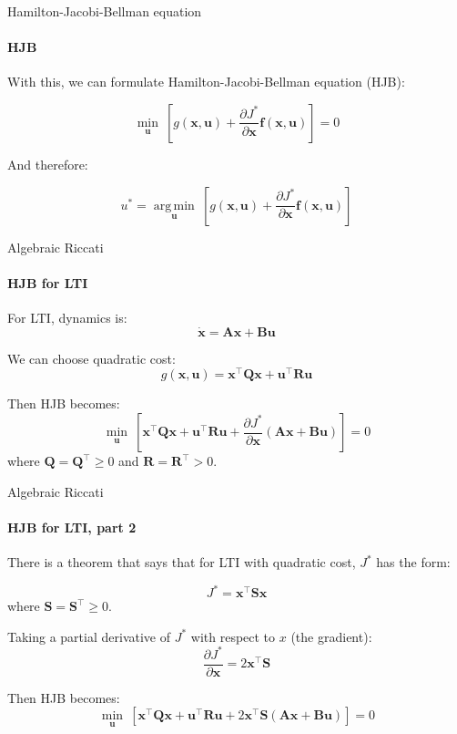 \documentclass{beamer}
\DeclareMathOperator*{\argmin}{arg\,min}
\begin{document}
\begin{frame}{Hamilton-Jacobi-Bellman equation}
\framesubtitle{HJB}
\begin{flushleft}

With this, we can formulate Hamilton-Jacobi-Bellman equation (HJB):

\[
\underset{\mathbf u}{\min} \ [ g(\mathbf x, \mathbf u) + 
\frac{\partial J^*}{\partial \mathbf x} \mathbf f (\mathbf x, \mathbf u) ] = 0
\]

And therefore:

\[
u^* = \underset{\mathbf u}{\argmin} \ [ g(\mathbf x, \mathbf u) + 
\frac{\partial J^*}{\partial \mathbf x} \mathbf f (\mathbf x, \mathbf u) ]
\]

\end{flushleft}
\end{frame}

\begin{frame}{Algebraic Riccati}
\framesubtitle{HJB for LTI}
\begin{flushleft}

For LTI, dynamics is:
\[
\dot {\mathbf x} = \mathbf A  \mathbf x + \mathbf B \mathbf u
\]

We can choose quadratic cost:
\[
g(\mathbf  x, \mathbf  u) = 
\mathbf  x^\top \mathbf Q \mathbf x +
\mathbf  u^\top \mathbf R \mathbf u 
\]

Then HJB becomes:
\[
\underset{\mathbf u}{\min} \ [ 
\mathbf  x^\top \mathbf Q \mathbf x +
\mathbf  u^\top \mathbf R \mathbf u + 
\frac{\partial J^*}{\partial \mathbf x} 
(\mathbf A  \mathbf x + \mathbf B \mathbf u)] = 0
\]
%
where $\mathbf Q = \mathbf Q^\top \geq 0 $ and $\mathbf R = \mathbf R^\top > 0$.

\end{flushleft}
\end{frame}


\begin{frame}{Algebraic Riccati}
\framesubtitle{HJB for LTI, part 2}
\begin{flushleft}

There is a theorem that says that for LTI with quadratic cost, $J^*$ has the form:

\[
J^* = \mathbf  x^\top \mathbf S \mathbf x
\]
%
where $\mathbf S = \mathbf S^\top \geq 0$.

\bigskip

Taking a partial derivative of $J^*$ with respect to $x$ (the gradient):
\[
\frac{\partial J^*}{\partial \mathbf x}  = 2\mathbf x^\top \mathbf S
\]

Then HJB becomes:
\[
\underset{\mathbf u}{\min} \ [ 
\mathbf  x^\top \mathbf Q \mathbf x +
\mathbf  u^\top \mathbf R \mathbf u + 
2\mathbf x^\top \mathbf S
(\mathbf A  \mathbf x + \mathbf B \mathbf u)] = 0
\]

\end{flushleft}
\end{frame}
\end{document}
